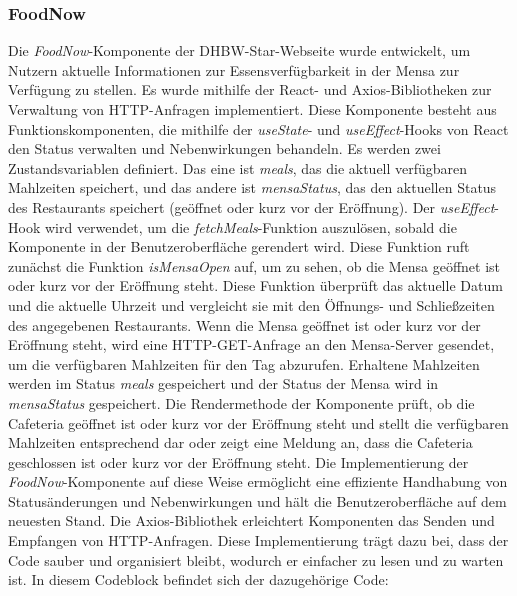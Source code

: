 \subsubsection{FoodNow}
Die \emph{FoodNow}-Komponente der DHBW-Star-Webseite wurde entwickelt, um Nutzern aktuelle Informationen zur Essensverfügbarkeit in der Mensa zur Verfügung zu stellen. Es wurde mithilfe der React- und Axios-Bibliotheken zur Verwaltung von HTTP-Anfragen implementiert. 
Diese Komponente besteht aus Funktionskomponenten, die mithilfe der \emph{useState}- und \emph{useEffect}-Hooks von React den Status verwalten und Nebenwirkungen behandeln. Es werden zwei Zustandsvariablen definiert. Das eine ist \emph{meals}, das die aktuell verfügbaren Mahlzeiten speichert, und das andere ist \emph{mensaStatus}, das den aktuellen Status des Restaurants speichert (geöffnet oder kurz vor der Eröffnung). 
Der \emph{useEffect}-Hook wird verwendet, um die \emph{fetchMeals}-Funktion auszulösen, sobald die Komponente in der Benutzeroberfläche gerendert wird. Diese Funktion ruft zunächst die Funktion \emph{isMensaOpen} auf, um zu sehen, ob die Mensa geöffnet ist oder kurz vor der Eröffnung steht. Diese Funktion überprüft das aktuelle Datum und die aktuelle Uhrzeit und vergleicht sie mit den  Öffnungs- und Schließzeiten des angegebenen Restaurants. 
Wenn die Mensa geöffnet ist oder kurz vor der Eröffnung steht, wird eine HTTP-GET-Anfrage an den Mensa-Server gesendet, um die verfügbaren Mahlzeiten für den  Tag abzurufen. Erhaltene Mahlzeiten werden  im Status \emph{meals} gespeichert und der Status der Mensa wird in \emph{mensaStatus} gespeichert. 
Die Rendermethode der Komponente prüft, ob die Cafeteria geöffnet ist oder kurz vor der Eröffnung steht und stellt die verfügbaren Mahlzeiten entsprechend dar oder zeigt eine Meldung an, dass die Cafeteria geschlossen ist oder kurz vor der Eröffnung steht. Die Implementierung der \emph{FoodNow}-Komponente auf diese Weise ermöglicht eine effiziente Handhabung von Statusänderungen und Nebenwirkungen und hält die Benutzeroberfläche auf dem neuesten Stand. Die Axios-Bibliothek erleichtert Komponenten das Senden und Empfangen von HTTP-Anfragen. Diese Implementierung trägt dazu bei, dass der Code sauber und  organisiert bleibt, wodurch er einfacher zu lesen und zu warten ist.
In diesem Codeblock befindet sich der dazugehörige Code:
